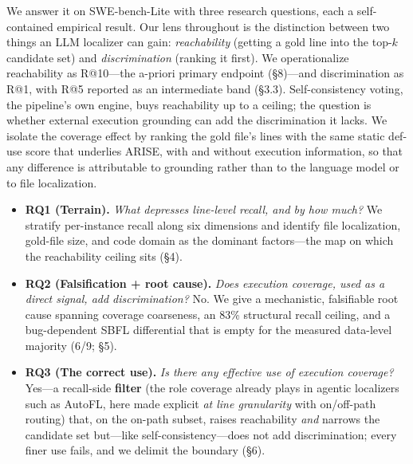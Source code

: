 \documentclass[11pt]{article}
\begin{document}
We answer it on SWE-bench-Lite with three research questions, each a self-contained empirical result. Our lens throughout is the distinction between two things an LLM localizer can gain: \emph{reachability} (getting a gold line into the top-$k$ candidate set) and \emph{discrimination} (ranking it first). We operationalize reachability as R@10---the a-priori primary endpoint (\S8)---and discrimination as R@1, with R@5 reported as an intermediate band (\S3.3). Self-consistency voting, the pipeline's own engine, buys reachability up to a ceiling; the question is whether external execution grounding can add the discrimination it lacks. We isolate the coverage effect by ranking the gold file's lines with the same static def-use score that underlies ARISE, with and without execution information, so that any difference is attributable to grounding rather than to the language model or to file localization.
\begin{itemize}
  \item \textbf{RQ1 (Terrain).} \emph{What depresses line-level recall, and by how much?} We stratify per-instance recall along six dimensions and identify file localization, gold-file size, and code domain as the dominant factors---the map on which the reachability ceiling sits (\S4).
  \item \textbf{RQ2 (Falsification + root cause).} \emph{Does execution coverage, used as a direct signal, add discrimination?} No. We give a mechanistic, falsifiable root cause spanning coverage coarseness, an 83\% structural recall ceiling, and a bug-dependent SBFL differential that is empty for the measured data-level majority (6/9; \S5).
  \item \textbf{RQ3 (The correct use).} \emph{Is there any effective use of execution coverage?} Yes---a recall-side \textbf{filter} (the role coverage already plays in agentic localizers such as AutoFL, here made explicit \emph{at line granularity} with on/off-path routing) that, on the on-path subset, raises reachability \emph{and} narrows the candidate set but---like self-consistency---does not add discrimination; every finer use fails, and we delimit the boundary (\S6).
\end{itemize}
\end{document}
